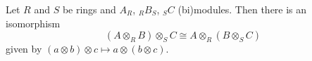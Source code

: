 Let $R$ and $S$ be rings and $A_R$, ${}_R B_S$, ${}_S C$ (bi)modules. Then there is an isomorphism
\[
(A \otimes_R B) \otimes_S C \cong A \otimes_R (B \otimes_S C)
\]
given by $(a \otimes b) \otimes c \mapsto a \otimes (b \otimes c)$.
